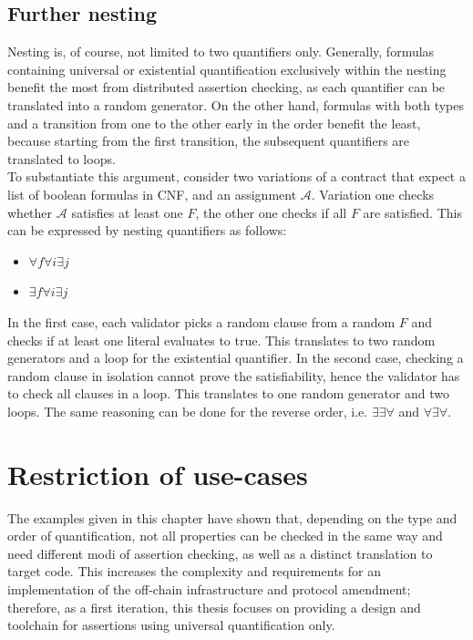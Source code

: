 \subsection{Further nesting}
Nesting is, of course, not limited to two quantifiers only. Generally, formulas containing universal or existential quantification exclusively within the nesting benefit the most from distributed assertion checking, as each quantifier can be translated into a random generator. On the other hand, formulas with both types and a transition from one to the other early in the order benefit the least, because starting from the first transition, the subsequent quantifiers are translated to loops.\\
To substantiate this argument, consider two variations of a contract that expect a list of boolean formulas in CNF, and an assignment $\mathcal{A}$. Variation one checks whether $\mathcal{A}$ satisfies at least one $F$, the other one checks if all $F$ are satisfied. This can be expressed by nesting quantifiers as follows: 
\begin{itemize}
\item $\forall f \forall i \exists j$
\item $\exists f \forall i \exists j$
\end{itemize}
In the first case, each validator picks a random clause from a random $F$ and checks if at least one literal evaluates to true. This translates to two random generators and a loop for the existential quantifier. In the second case, checking a random clause in isolation cannot prove the satisfiability, hence the validator has to check all clauses in a loop. This translates to one random generator and two loops. The same reasoning can be done for the reverse order, i.e. $\exists\exists\forall$ and $\forall\exists\forall$.

\section{Restriction of use-cases}
The examples given in this chapter have shown that, depending on the type and order of quantification, not all properties can be checked in the same way and need different modi of assertion checking, as well as a distinct translation to target code. This increases the complexity and requirements for an implementation of the off-chain infrastructure and protocol amendment; therefore, as a first iteration, this thesis focuses on providing a design and toolchain for assertions using universal quantification only.

